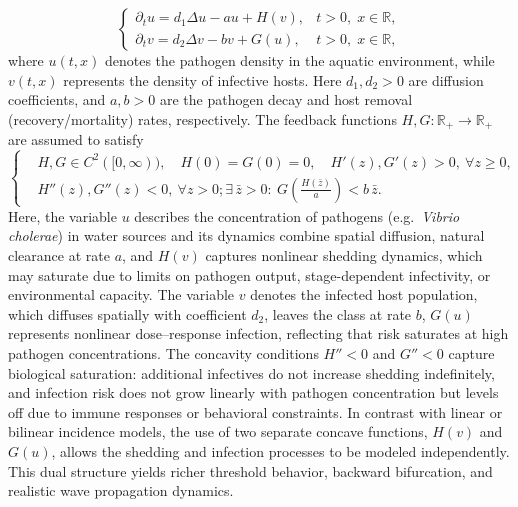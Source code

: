 \documentclass[a4paper,11pt]{amsart}
\theoremstyle{definition}
\numberwithin{equation}{section}
\theoremstyle{definition}
\begin{document}
\begin{equation}
\label{eq:HYmodel}
\begin{cases}
\partial_t u = d_1 \Delta u - a u + H(v), & t>0,\; x\in \mathbb{R},\\[0.4em]
\partial_t v = d_2 \Delta v - b v + G(u), & t>0,\; x\in \mathbb{R},
\end{cases}
\end{equation}
where $u(t,x)$ denotes the pathogen density in the aquatic environment, while $v(t,x)$ represents the density of infective hosts.
Here $d_1,d_2>0$ are diffusion coefficients, and $a,b>0$ are the pathogen decay and host removal (recovery/mortality) rates, respectively.
The feedback functions $H,G:\mathbb{R}_+\to\mathbb{R}_+$ are assumed to satisfy
\begin{equation}
\label{eq:HYassump}
\left\{
\begin{aligned}
& H,G \in C^2([0,\infty)), \quad H(0)=G(0)=0,\quad H'(z),G'(z)>0,\ \forall z\geq 0, \\[0.4em]
& H''(z),G''(z)<0,\ \forall z>0; \exists\,\bar z>0:\ G\!\left(\tfrac{H(\bar z)}{a}\right)< b\,\bar z .
\end{aligned}
\right.
\tag{1.4}
\end{equation}
Here, the variable $u$ describes the concentration of pathogens (e.g.\ \emph{Vibrio cholerae}) in water sources and its dynamics combine spatial diffusion, natural clearance at rate $a$, and  $H(v)$ captures nonlinear shedding dynamics, which may saturate due to limits on pathogen output, stage-dependent infectivity, or environmental capacity.
The variable $v$ denotes the infected host population, which diffuses spatially with coefficient $d_2$, leaves the class at rate $b$, $G(u)$ represents nonlinear dose--response infection, reflecting that risk saturates at high pathogen concentrations. The concavity conditions $H''<0$ and $G''<0$ capture biological saturation: additional infectives do not increase shedding indefinitely, and infection risk does not grow linearly with pathogen concentration but levels off due to immune responses or behavioral constraints. In contrast with linear or bilinear incidence models, the use of two separate concave functions, $H(v)$ and $G(u)$, allows the shedding and infection processes to be modeled independently. This dual structure yields richer threshold behavior, backward bifurcation, and realistic wave propagation dynamics.
\end{document}
